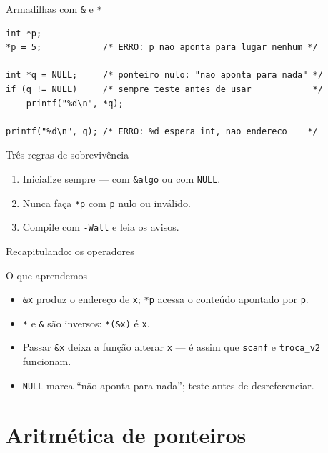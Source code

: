 \documentclass[aspectratio=169]{beamer}
\begin{document}
\begin{frame}[fragile]{Armadilhas com \texttt{\&} e \texttt{*}}
\vspace{-2mm}
\begin{lstlisting}
int *p;
*p = 5;            /* ERRO: p nao aponta para lugar nenhum */

int *q = NULL;     /* ponteiro nulo: "nao aponta para nada" */
if (q != NULL)     /* sempre teste antes de usar            */
    printf("%d\n", *q);

printf("%d\n", q); /* ERRO: %d espera int, nao endereco    */
\end{lstlisting}
  \begin{alertblock}{Três regras de sobrevivência}
    \begin{enumerate}
      \item Inicialize sempre --- com \texttt{\&algo} ou com \texttt{NULL}.
      \item Nunca faça \texttt{*p} com \texttt{p} nulo ou inválido.
      \item Compile com \texttt{-Wall} e leia os avisos.
    \end{enumerate}
  \end{alertblock}
\end{frame}

\begin{frame}{Recapitulando: os operadores}
  \begin{block}{O que aprendemos}
    \begin{itemize}
      \item \texttt{\&x} produz o endereço de \texttt{x}; \texttt{*p} acessa o
        conteúdo apontado por \texttt{p}.
      \item \texttt{*} e \texttt{\&} são inversos: \texttt{*(\&x)} é \texttt{x}.
      \item Passar \texttt{\&x} deixa a função alterar \texttt{x} --- é assim
        que \texttt{scanf} e \texttt{troca\_v2} funcionam.
      \item \texttt{NULL} marca ``não aponta para nada''; teste antes de
        desreferenciar.
    \end{itemize}
  \end{block}
\end{frame}

\section{Aritmética de ponteiros}
\end{document}
